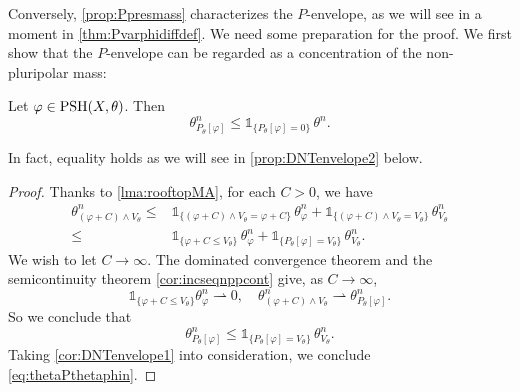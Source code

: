 Conversely, \cref{prop:Ppresmass} characterizes the $P$-envelope, as we will see in a moment in \cref{thm:Pvarphidiffdef}. We need some preparation for the proof. We first show that the $P$-envelope can be regarded as a concentration of the non-pluripolar mass:
\begin{theorem}\label{thm:Pvarphisupport}
    Let $\varphi\in \mathrm{PSH}(X,\theta)$. Then
    \begin{equation}\label{eq:thetaPthetaphin}
        \theta_{P_{\theta}[\varphi]}^n\leq \mathds{1}_{\{P_{\theta}[\varphi]=0\}}\,\theta^n.
    \end{equation}
\end{theorem}
In fact, equality holds as we will see in \cref{prop:DNTenvelope2} below.
\begin{proof}
    Thanks to \cref{lma:rooftopMA}, for each $C>0$, we have
    \[
    \begin{aligned}
    \theta_{(\varphi+C)\land V_{\theta}}^n\leq & \mathds{1}_{\{(\varphi+C)\land V_{\theta}=\varphi+C\} }\, \theta_{\varphi}^n+\mathds{1}_{\{(\varphi+C)\land V_{\theta}=V_{\theta}\} }\, \theta_{V_{\theta}}^n\\
    \leq & \mathds{1}_{\{\varphi+C\leq V_{\theta}\} }\, \theta_{\varphi}^n+\mathds{1}_{\{P_{\theta}[\varphi]=V_{\theta}\} } \,\theta_{V_{\theta}}^n.
    \end{aligned}
    \]
    We wish to let $C\to\infty$.
    The dominated convergence theorem and the semicontinuity theorem \cref{cor:incseqnppcont} give, as $C\to\infty$,
    \[
    \mathds{1}_{\{\varphi+C\leq V_{\theta}\} } \theta_{\varphi}^n\rightharpoonup 0,\quad
    \theta_{(\varphi+C)\land V_{\theta}}^n\rightharpoonup \theta_{P_{\theta}[\varphi]}^n.
    \]
    So we conclude that
    \[
    \theta_{P_{\theta}[\varphi]}^n\leq \mathds{1}_{\{P_{\theta}[\varphi]=V_{\theta}\}} \,\theta_{V_{\theta}}^n.
    \]
    Taking \cref{cor:DNTenvelope1} into consideration, we conclude \eqref{eq:thetaPthetaphin}.
\end{proof}

